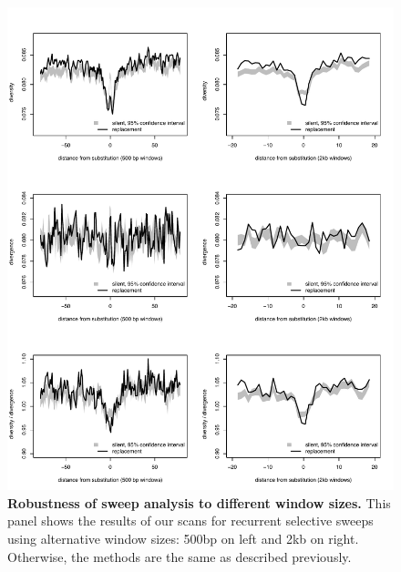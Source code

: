 \begin{figure}[h!]
      \centering
       \includegraphics[width=\linewidth]{Ch2FigS8}
    \caption{\textbf{Robustness of sweep analysis to different window sizes.} This panel shows the results of our scans for recurrent selective sweeps using alternative window sizes: 500bp on left and 2kb on right. Otherwise, the methods are the same as described previously.}
    \label{fig:figS8}
\end{figure}

